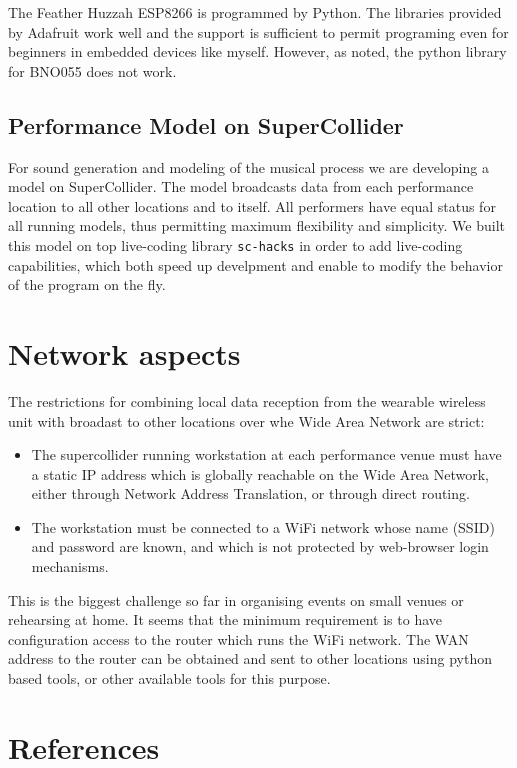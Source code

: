 \documentclass[11pt]{article}
\begin{document}
The Feather Huzzah ESP8266 is programmed by Python.  The libraries provided by Adafruit work well and the support is sufficient to permit programing even for beginners in embedded devices like myself.  However, as noted, the python library for BNO055 does not work. 

\subsection{Performance Model on SuperCollider}
\label{sec:orgaabfd00}

For sound generation and modeling of the musical process we are developing a model on SuperCollider.  The model broadcasts data from each performance location to all other locations and to itself.  All performers have equal status for all running models, thus permitting maximum flexibility and simplicity.  We built this model on top live-coding library \texttt{sc-hacks} in order to add live-coding capabilities, which both speed up develpment and enable to modify the behavior of the program on the fly. 

\section{Network aspects}
\label{sec:org38d5b25}

The restrictions for combining local data reception from the wearable wireless unit with broadast to other locations over whe Wide Area Network are strict: 

\begin{itemize}
\item The supercollider running workstation at each performance venue must have a static IP address which is globally reachable on the Wide Area Network, either through Network Address Translation, or through direct routing.
\item The workstation must be connected to a WiFi network whose name (SSID) and password are known, and which is not protected by web-browser login mechanisms.
\end{itemize}

This is the biggest challenge so far in organising events on small venues or rehearsing at home.  It seems that the minimum requirement is to have configuration access to the router which runs the WiFi network.  The WAN address to the router can be obtained and sent to other locations using python based tools, or other available tools for this purpose. 

\section{References}
\label{sec:org5b7107e}
\end{document}
